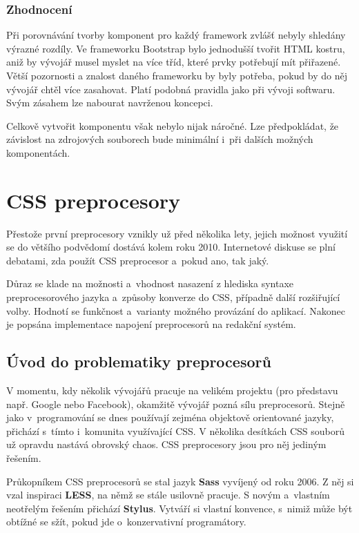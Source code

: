 \documentclass[thesis=B,czech]{FITthesis}[2012/06/26]
\begin{document}
\subsection{Zhodnocení}
Při porovnávání tvorby komponent pro každý framework zvlášť nebyly shledány výrazné rozdíly. Ve frameworku Bootstrap bylo jednodušší tvořit \gls{HTML} kostru, aniž by vývojář musel myslet na více tříd, které prvky potřebují mít přiřazené. Větší pozornosti a znalost daného frameworku by byly potřeba, pokud by do něj vývojář chtěl více zasahovat. Platí podobná pravidla jako při vývoji softwaru. Svým zásahem lze nabourat navrženou koncepci.

Celkově vytvořit komponentu však nebylo nijak náročné. Lze předpokládat, že závislost na zdrojových souborech bude minimální i~při dalších možných komponentách.


\chapter{CSS preprocesory}
Přestože první preprocesory vznikly už před několika lety, jejich možnost využití se do většího podvědomí dostává kolem roku 2010. Internetové diskuse se plní debatami, zda použít \gls{CSS} preprocesor a~pokud ano, tak jaký. 

Důraz se klade na možnosti a~vhodnost nasazení z hlediska syntaxe preprocesorového jazyka a~způsoby konverze do \gls{CSS}, případně další rozšiřující volby. Hodnotí se funkčnost a~varianty možného provázání do aplikací. Nakonec je popsána implementace napojení preprocesorů na redakční systém.


\section{Úvod do problematiky preprocesorů}


V momentu, kdy několik vývojářů pracuje na velikém projektu (pro představu např. Google nebo Facebook), okamžitě vývojář pozná sílu preprocesorů. Stejně jako v~programování se dnes používají zejména objektově orientované jazyky, přichází s~tímto i~komunita využívající \gls{CSS}. V několika desítkách \gls{CSS} souborů už opravdu nastává obrovský chaos. \gls{CSS} preprocesory jsou pro něj jediným řešením.

Průkopníkem \gls{CSS} preprocesorů se stal jazyk \textbf{\gls{Sass}} vyvíjený od roku 2006. Z něj si vzal inspiraci \textbf{LESS}, na němž se stále usilovně pracuje. S novým a~vlastním neotřelým řešením přichází \textbf{Stylus}. Vytváří si vlastní konvence, s~nimiž může být obtížné se sžít, pokud jde o~konzervativní programátory. 
\end{document}
